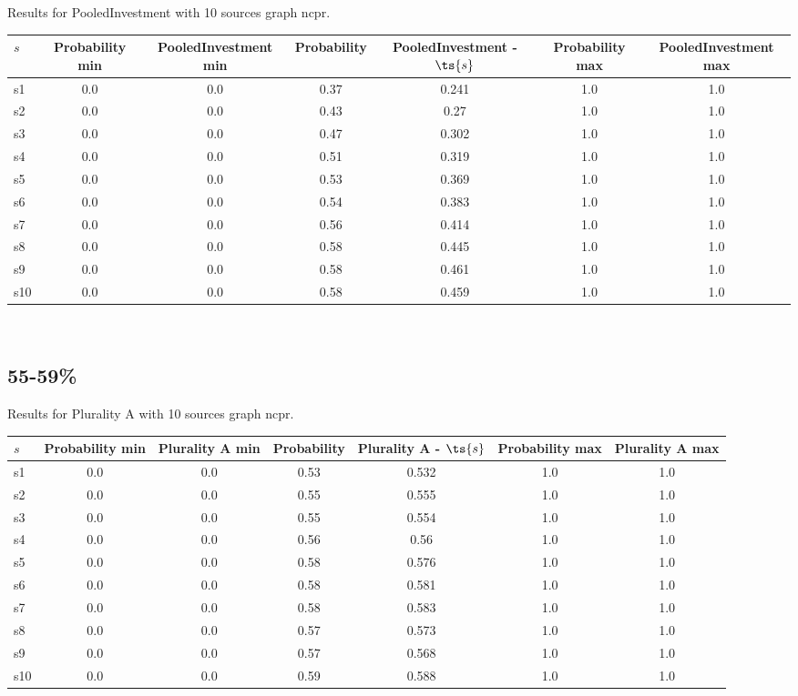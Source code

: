 \documentclass{article}
\begin{document}
\noindent Results for PooledInvestment with 10 sources graph ncpr.

\noindent\begin{tabular}{|l|c|c|c|c|c|c|}
\hline
$s$& Probability min & PooledInvestment min & Probability & PooledInvestment - $\ts{s}$ & Probability max & PooledInvestment max\\
\hline
s1 &0.0 & 0.0 & 0.37 & 0.241 & 1.0 & 1.0\\
\hline
s2 &0.0 & 0.0 & 0.43 & 0.27 & 1.0 & 1.0\\
\hline
s3 &0.0 & 0.0 & 0.47 & 0.302 & 1.0 & 1.0\\
\hline
s4 &0.0 & 0.0 & 0.51 & 0.319 & 1.0 & 1.0\\
\hline
s5 &0.0 & 0.0 & 0.53 & 0.369 & 1.0 & 1.0\\
\hline
s6 &0.0 & 0.0 & 0.54 & 0.383 & 1.0 & 1.0\\
\hline
s7 &0.0 & 0.0 & 0.56 & 0.414 & 1.0 & 1.0\\
\hline
s8 &0.0 & 0.0 & 0.58 & 0.445 & 1.0 & 1.0\\
\hline
s9 &0.0 & 0.0 & 0.58 & 0.461 & 1.0 & 1.0\\
\hline
s10 &0.0 & 0.0 & 0.58 & 0.459 & 1.0 & 1.0\\
\hline
\end{tabular}\\

\newpage

\subsection{55-59\%}

\noindent Results for Plurality A with 10 sources graph ncpr.

\noindent\begin{tabular}{|l|c|c|c|c|c|c|}
\hline
$s$& Probability min & Plurality A min & Probability & Plurality A - $\ts{s}$ & Probability max & Plurality A max\\
\hline
s1 &0.0 & 0.0 & 0.53 & 0.532 & 1.0 & 1.0\\
\hline
s2 &0.0 & 0.0 & 0.55 & 0.555 & 1.0 & 1.0\\
\hline
s3 &0.0 & 0.0 & 0.55 & 0.554 & 1.0 & 1.0\\
\hline
s4 &0.0 & 0.0 & 0.56 & 0.56 & 1.0 & 1.0\\
\hline
s5 &0.0 & 0.0 & 0.58 & 0.576 & 1.0 & 1.0\\
\hline
s6 &0.0 & 0.0 & 0.58 & 0.581 & 1.0 & 1.0\\
\hline
s7 &0.0 & 0.0 & 0.58 & 0.583 & 1.0 & 1.0\\
\hline
s8 &0.0 & 0.0 & 0.57 & 0.573 & 1.0 & 1.0\\
\hline
s9 &0.0 & 0.0 & 0.57 & 0.568 & 1.0 & 1.0\\
\hline
s10 &0.0 & 0.0 & 0.59 & 0.588 & 1.0 & 1.0\\
\hline
\end{tabular}\\
\end{document}
